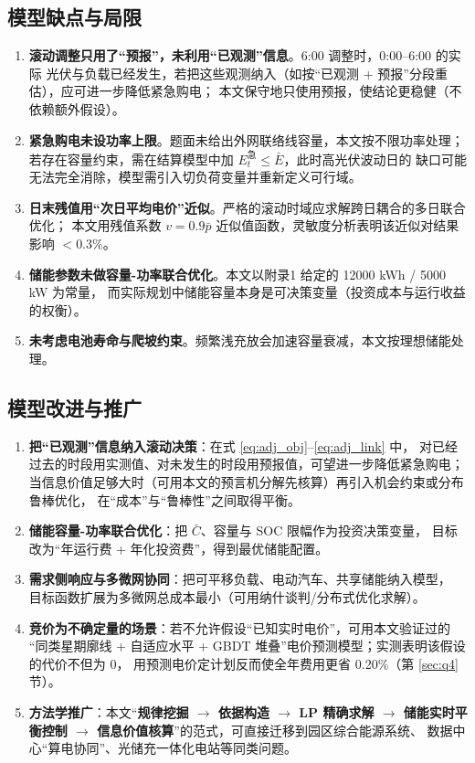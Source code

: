 \subsection{模型缺点与局限}

\begin{enumerate}[label=(\arabic*), leftmargin=2.2em, itemsep=2pt]
\item \textbf{滚动调整只用了“预报”，未利用“已观测”信息}。6:00 调整时，0:00--6:00 的实际
光伏与负载已经发生，若把这些观测纳入（如按“已观测 + 预报”分段重估），应可进一步降低紧急购电；
本文保守地只使用预报，使结论更稳健（不依赖额外假设）。
\item \textbf{紧急购电未设功率上限}。题面未给出外网联络线容量，本文按不限功率处理；
若存在容量约束，需在结算模型中加 $E^{\text{急}}_t\le \bar E$，此时高光伏波动日的
缺口可能无法完全消除，模型需引入切负荷变量并重新定义可行域。
\item \textbf{日末残值用“次日平均电价”近似}。严格的滚动时域应求解跨日耦合的多日联合优化；
本文用残值系数 $v=0.9\bar p$ 近似值函数，灵敏度分析表明该近似对结果影响 $<0.3\text{\%}$。
\item \textbf{储能参数未做容量-功率联合优化}。本文以附录1 给定的 12000 kWh / 5000 kW 为常量，
而实际规划中储能容量本身是可决策变量（投资成本与运行收益的权衡）。
\item \textbf{未考虑电池寿命与爬坡约束}。频繁浅充放会加速容量衰减，本文按理想储能处理。
\end{enumerate}

\subsection{模型改进与推广}

\begin{enumerate}[label=(\arabic*), leftmargin=2.2em, itemsep=2pt]
\item \textbf{把“已观测”信息纳入滚动决策}：在式 \eqref{eq:adj_obj}--\eqref{eq:adj_link} 中，
对已经过去的时段用实测值、对未发生的时段用预报值，可望进一步降低紧急购电；
当信息价值足够大时（可用本文的预言机分解先核算）再引入机会约束或分布鲁棒优化，
在“成本”与“鲁棒性”之间取得平衡。
\item \textbf{储能容量-功率联合优化}：把 $\bar C$、容量与 SOC 限幅作为投资决策变量，
目标改为“年运行费 + 年化投资费”，得到最优储能配置。
\item \textbf{需求侧响应与多微网协同}：把可平移负载、电动汽车、共享储能纳入模型，
目标函数扩展为多微网总成本最小（可用纳什谈判/分布式优化求解）。
\item \textbf{竞价为不确定量的场景}：若不允许假设“已知实时电价”，可用本文验证过的
“同类星期廓线 + 自适应水平 + GBDT 堆叠”电价预测模型；实测表明该假设的代价不但为 0，
用预测电价定计划反而使全年费用更省 0.20\%（第 \ref{sec:q4} 节）。
\item \textbf{方法学推广}：本文“\textbf{规律挖掘 $\to$ 依据构造 $\to$ LP 精确求解 $\to$
储能实时平衡控制 $\to$ 信息价值核算}”的范式，可直接迁移到园区综合能源系统、
数据中心“算电协同”、光储充一体化电站等同类问题。
\end{enumerate}
